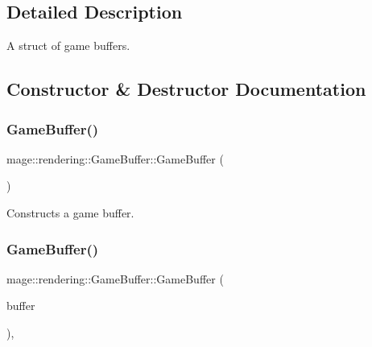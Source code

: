 \subsection{Detailed Description}
A struct of game buffers. 

\subsection{Constructor \& Destructor Documentation}
\hypertarget{structmage_1_1rendering_1_1_game_buffer_ad38868666dffd8967a04e87a6ff9ebc5}{}\label{structmage_1_1rendering_1_1_game_buffer_ad38868666dffd8967a04e87a6ff9ebc5} 
\subsubsection{\texorpdfstring{Game\+Buffer()}{GameBuffer()}\hspace{0.1cm}{\footnotesize\ttfamily [1/3]}}
{\footnotesize\ttfamily mage\+::rendering\+::\+Game\+Buffer\+::\+Game\+Buffer (\begin{DoxyParamCaption}{ }\end{DoxyParamCaption})\hspace{0.3cm}{\ttfamily [noexcept]}}

Constructs a game buffer. \hypertarget{structmage_1_1rendering_1_1_game_buffer_ad7cd514cc0c422bce555f8435a06d7d0}{}\label{structmage_1_1rendering_1_1_game_buffer_ad7cd514cc0c422bce555f8435a06d7d0} 
\subsubsection{\texorpdfstring{Game\+Buffer()}{GameBuffer()}\hspace{0.1cm}{\footnotesize\ttfamily [2/3]}}
{\footnotesize\ttfamily mage\+::rendering\+::\+Game\+Buffer\+::\+Game\+Buffer (\begin{DoxyParamCaption}\item[{const \hyperlink{structmage_1_1rendering_1_1_game_buffer}{Game\+Buffer} \&}]{buffer }\end{DoxyParamCaption})\hspace{0.3cm}{\ttfamily [default]}, {\ttfamily [noexcept]}}

